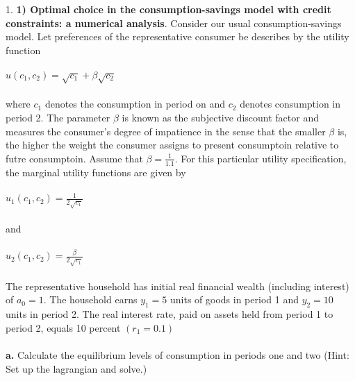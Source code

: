 \documentclass[11pt]{SelfArxOneColBMN}
\affiliation{\textsuperscript{1}\textit{John E. Walker Department of Economics,
Clemson University,Clemson, SC: email ijdavis@g.clemson.edu}}
\date{\small{Version ~\today}}
\begin{document}
\flushbottom

\maketitle

\renewcommand{\theexercise}{\arabic{exercise}}%

1. \textbf{1) Optimal choice in the consumption-savings model with credit constraints: a numerical analysis}. Consider our usual consumption-savings model. Let preferences of the representative consumer be describes by the utility function\\
\\
$u(c_1,c_2) = \sqrt{c_1} + \beta\sqrt{c_2}$\\
\\
where $c_1$ denotes the consumption in period on and $c_2$ denotes consumption in period 2. The parameter $\beta$ is known as the subjective discount factor and measures the consumer's degree of impatience in the sense that the smaller $\beta$ is, the higher the weight the consumer assigns to present consumptoin relative to futre consumptoin. Assume that $\beta = \frac{1}{1.1}$. For this particular utility specification, the marginal utility functions are given by\\
\\
$u_1(c_1,c_2) = \frac{1}{2\sqrt{c_1}}$\\
\\
and\\
\\
$u_2(c_1,c_2) = \frac{\beta}{2\sqrt{c_1}}$\\
\\
The representative household has initial real financial wealth (including interest) of $a_0 = 1$. The household earns  $y_1 = 5$ units of goods in period 1 and $y_2 = 10$ units in period 2. The real interest rate, paid on assets held from period 1 to period 2, equals 10 percent $(r_1 = 0.1)$\\
\\
\indent \textbf{a.} Calculate the equilibrium levels of consumption in periods one and two (Hint: Set up the lagrangian and solve.)\\
\\
\end{document}

